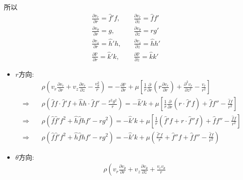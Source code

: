 \documentclass[../main.tex]{subfiles}
\begin{document}
\begin{itemize}
\begin{enumerate}
\begin{equation}
    \end{equation}
    所以
    \begin{align}
      \frac{\partial v_r}{\partial r} = \hat f' f, \quad & \frac{\partial v_r}{\partial z} = \hat f f' \\
      \frac{\partial v_\theta}{\partial r} = g , \quad & \frac{\partial v_\theta}{\partial z} = r g'\\
      \frac{\partial v_z}{\partial r} = \hat h' h , \quad & \frac{\partial v_z}{\partial z} = \hat h h' \\
      \frac{\partial \mathbb{P}}{\partial r} = \hat k' k , \quad & \frac{\partial \mathbb{P}}{\partial z} = \hat k k' 
    \end{align}
    \begin{itemize}
      \item $r$方向:
      \begin{align}
        & \rho \left(
          v_r \frac{\partial v_r}{\partial r} + v_z \frac{\partial v_r}{\partial z} - \frac{v_\theta^2}{r}
        \right) = -\frac{\partial \mathbb{P}}{\partial r} + \mu \left[
          \frac{1}{r}\frac{\partial }{\partial r}\left(
            r \frac{\partial v_r}{\partial r}
          \right) + \frac{\partial^2 v_r}{\partial z^2} - \frac{v_r}{r^2}
        \right] \nonumber\\
        \Rightarrow \quad & \rho \left(
          \hat ff \cdot \hat f'f + \hat h h \cdot \hat ff' - \frac{r^2 g^2}{r}
        \right) = -\hat k' k + \mu \left[
          \frac{1}{r}\frac{\partial }{\partial r}\left(
            r \cdot \hat f' f
          \right) + \hat f f'' - \frac{\hat ff}{r^2}
        \right] \nonumber\\
        \Rightarrow \quad & \rho \left(
          \hat f\hat f' f^2 + \hat h \hat f h f' - r g^2
        \right) = -\hat k' k + \mu \left[
          \frac{1}{r}\left(
            \hat f' f + r \cdot \hat f'' f
          \right) + \hat f f'' - \frac{\hat ff}{r^2}
        \right] \nonumber\\
        \Rightarrow \quad & \rho \left(
          \hat f\hat f' f^2 + \hat h \hat f h f' - r g^2
        \right) = -\hat k' k + \mu \left(
          \frac{\hat f' f}{r} + \hat f'' f + \hat f f'' - \frac{\hat ff}{r^2}
        \right) 
      \end{align}
      \item $\theta$方向:
      \begin{align}
        & \rho \left(
          v_r \frac{\partial v_\theta}{\partial r} + v_z \frac{\partial v_\theta}{\partial z} + \frac{v_r v_\theta}{r}

\end{align}
\end{itemize}
\end{enumerate}
\end{itemize}
\end{document}
